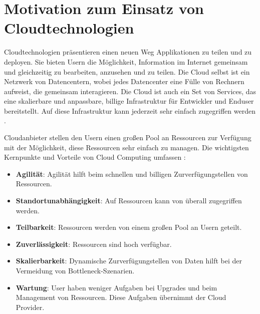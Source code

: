 \section{Motivation zum Einsatz von Cloudtechnologien}
Cloudtechnologien präsentieren einen neuen Weg Applikationen zu teilen und zu deployen. Sie bieten Usern die Möglichkeit, Information im Internet gemeinsam und gleichzeitig zu bearbeiten, anzusehen und zu teilen. Die Cloud selbst ist ein Netzwerk von Datencentern, wobei jedes Datencenter eine Fülle von Rechnern aufweist, die gemeinsam interagieren. Die Cloud ist auch ein Set von Services, das eine skalierbare und anpassbare, billige Infrastruktur für Entwickler und Enduser bereitstellt. Auf diese Infrastruktur kann jederzeit sehr einfach zugegriffen werden \cite{CloudComputing}.

Cloudanbieter stellen den Usern einen großen Pool an Ressourcen zur Verfügung mit der Möglichkeit, diese Ressourcen sehr einfach zu managen. Die wichtigsten Kernpunkte und Vorteile von Cloud Computing umfassen \cite{CloudComputing}:
\begin{itemize}
	\item \textbf{Agilität}: Agilität hilft beim schnellen und billigen Zurverfügungstellen von Ressourcen.
	\item \textbf{Standortunabhängigkeit}: Auf Ressourcen kann von überall zugegriffen werden.
	\item \textbf{Teilbarkeit}: Ressourcen werden von einem großen Pool an Usern geteilt.
	\item \textbf{Zuverlässigkeit}: Ressourcen sind hoch verfügbar.
	\item \textbf{Skalierbarkeit}: Dynamische Zurverfügungstellen von Daten hilft bei der Vermeidung von Bottleneck-Szenarien.
	\item \textbf{Wartung}: User haben weniger Aufgaben bei Upgrades und beim Management von Ressourcen. Diese Aufgaben übernimmt der Cloud Provider.
\end{itemize}


